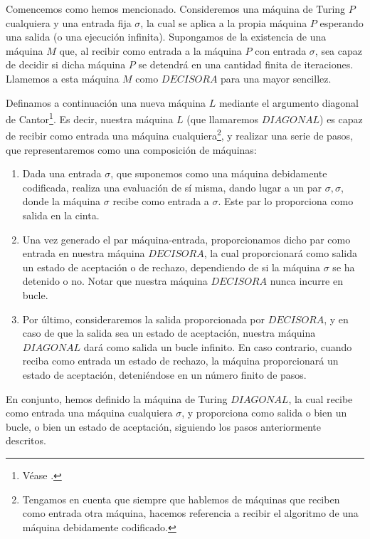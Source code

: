 Comencemos como hemos mencionado. Consideremos una máquina de Turing $P$ cualquiera y una entrada fija $\sigma$, la cual se aplica a la propia máquina $P$ esperando una salida (o una ejecución infinita). Supongamos de la
existencia de una máquina $M$ que, al recibir como entrada a la máquina $P$ con entrada $\sigma$, sea capaz de decidir si dicha máquina $P$ se detendrá en una cantidad finita de iteraciones. Llamemos a esta máquina $M$ como
$DECISORA$ para una mayor sencillez.

Definamos a continuación una nueva máquina $L$ mediante el argumento diagonal de Cantor\footnote{Véase \cite{binder2008theories}.}. Es decir, nuestra máquina $L$ (que llamaremos $DIAGONAL$) es capaz de recibir como entrada 
una máquina cualquiera\footnote{Tengamos en cuenta que siempre que hablemos de máquinas que reciben como entrada otra máquina, hacemos referencia a recibir el algoritmo de una máquina debidamente codificado.}, y realizar una
serie de pasos, que representaremos como una composición de máquinas:

\begin{enumerate}
        \item Dada una entrada $\sigma$, que suponemos como una máquina debidamente codificada, realiza una evaluación de sí misma, dando lugar a un par $\sigma, \sigma$, donde la máquina $\sigma$ recibe como entrada a $\sigma$.
                Este par lo proporciona como salida en la cinta.
        \item Una vez generado el par máquina-entrada, proporcionamos dicho par como entrada en nuestra máquina $DECISORA$, la cual proporcionará como salida un estado de aceptación o de rechazo, dependiendo de si la máquina $\sigma$
                se ha detenido o no. Notar que nuestra máquina $DECISORA$ nunca incurre en bucle.
        \item Por último, consideraremos la salida proporcionada por $DECISORA$, y en caso de que la salida sea un estado de aceptación, nuestra máquina $DIAGONAL$ dará como salida un bucle infinito. En caso contrario, cuando reciba 
                como entrada un estado de rechazo, la máquina proporcionará un estado de aceptación, deteniéndose en un número finito de pasos.
\end{enumerate}

En conjunto, hemos definido la máquina de Turing $DIAGONAL$, la cual recibe como entrada una máquina cualquiera $\sigma$, y proporciona como salida o bien un bucle, o bien un estado de aceptación, siguiendo los pasos anteriormente
descritos.

